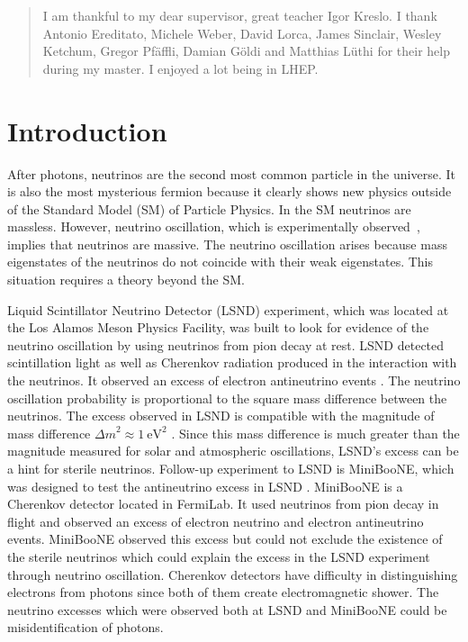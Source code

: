 \documentclass[a4paper]{article}\linespread{1.4}
\begin{document}
\newpage\null\thispagestyle{empty}
\renewcommand{\abstractname}{Acknowledgements}
\begin{abstract}
I am thankful to my dear supervisor, great teacher Igor Kreslo. 
I thank Antonio Ereditato, Michele Weber, David Lorca, James Sinclair, Wesley Ketchum, Gregor Pfäffli, Damian Göldi and Matthias Lüthi for their help during my master.
I enjoyed a lot being in LHEP.

\end{abstract}


\newpage\null\thispagestyle{empty}


\tableofcontents
\newpage

\section{Introduction}
\label{chap:intro}
After photons, neutrinos are the second most common particle in the universe. It is also the most mysterious fermion because it clearly shows new physics outside of the Standard Model (SM) of Particle Physics.
In the SM neutrinos are massless. However, neutrino oscillation, which is experimentally observed~\cite{vcx}, implies that neutrinos are massive.
The neutrino oscillation arises because mass eigenstates of the neutrinos do not coincide with their weak eigenstates. This situation requires a theory beyond the SM.

Liquid Scintillator Neutrino Detector (LSND) experiment, which was located at the Los Alamos Meson Physics Facility, was built to look for evidence of the neutrino oscillation by using neutrinos from pion decay at rest.
LSND detected scintillation light as well as Cherenkov radiation produced in the interaction with the neutrinos. It observed an excess of electron antineutrino events \cite{MN}. The neutrino oscillation probability is proportional to the square mass difference between the neutrinos. The excess observed in LSND is compatible with the magnitude of mass difference ${\Delta m}^{2} \approx 1~{\mathrm{eV}}^{2}$ \cite{MN}. Since this mass difference is much greater than the magnitude measured for solar and atmospheric oscillations, LSND's excess can be a hint for sterile neutrinos. Follow-up experiment to LSND is MiniBooNE, which was designed to test the antineutrino excess in LSND \cite{MN}. MiniBooNE is a Cherenkov detector located in FermiLab. It used neutrinos from pion decay in flight and observed an excess of electron neutrino and electron antineutrino events. MiniBooNE observed this excess but could not exclude the existence of the sterile neutrinos which could explain the excess in the LSND experiment through neutrino oscillation. 
Cherenkov detectors have difficulty in distinguishing electrons from photons since both of them create electromagnetic shower.
The neutrino excesses which were observed both at LSND and MiniBooNE could be misidentification of photons.
\end{document}
